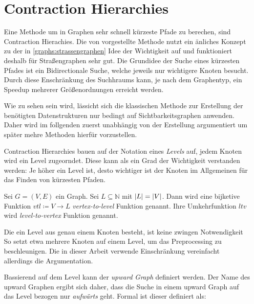 \chapter{Contraction Hierarchies}\label{chapter:ch}

Eine Methode um in Graphen sehr schnell kürzeste Pfade zu berechen, sind Contraction Hierachies.
Die von \cite{geisberger2008contraction} vorgestellte Methode nutzt ein änliches Konzept zu der in \autoref{graphs:strassengraphen} Idee der Wichtigkeit auf und funktioniert deshalb für Straßengraphen sehr gut.
Die Grundidee der Suche eines kürzesten Pfades ist ein Bidirectionale Suche, welche jeweils nur wichtigere Knoten besucht.
Durch diese Enschränkung des Suchhraums kann, je nach dem Graphentyp, ein Speedup mehrerer Größenordnungen erreicht werden.

Wie zu sehen sein wird, lässicht sich die klassischen Methode zur Erstellung der benötigten Datenstrukturen nur bedingt auf Sichtbarkeitsgraphen anwenden.
Daher wird im follgenden zuerst unabhängig von der Erstellung argumentiert um später mehre Methoden hierfür vorzustellen.

Contraction Hierarchies bauen auf der Notation eines \emph{Levels} auf, jedem Knoten wird ein Level zugeorndet.
Diese kann als ein Grad der Wichtigkeit verstanden werden:
Je höher ein Level ist, desto wichtiger ist der Knoten im Allgemeinen für das Finden von kürzesten Pfaden.

\begin{definition}[Level]
    Sei $G = (V, E)$ ein Graph.
    Sei $L \subseteq \mathbb{N}$ mit $\abs{L} = \abs{V}$.
    Dann wird eine bijketive Funktion ${vtl} \coloneq V \to L$ \emph{vertex-to-level} Funktion genannt.
    Ihre Umkehrfunktion ${ltv}$ wird \emph{level-to-vertex} Funktion genannt.
\end{definition}

Die ein Level aus genau einem Knoten besteht, ist keine zwingen Notwendigkeit
So setzt \cite{vetter2009parallel} etwa mehrere Knoten auf einem Level, um das Preprocessing zu beschleunigen.
Die in dieser Arbeit verwende Einschränkung vereinfacht allerdings die Argumentation.

Bassierend auf dem Level kann der \emph{upward Graph} definiert werden.
Der Name des upward Graphen ergibt sich daher, dass die Suche in einem upward Graph auf das Level bezogen nur \emph{aufwärts} geht.
Formal ist dieser definiert als:

